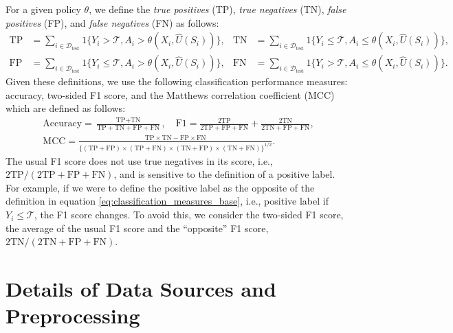 \documentclass[12pt]{article}
\begin{document}
For a given policy $\theta$, we define the \textit{true positives} (TP), \textit{true negatives} (TN), \textit{false positives} (FP), and \textit{false negatives} (FN) as follows:
\begin{equation}\label{eq:classification_measures_base}
\begin{aligned}
\text{TP} &= \sum_{i \in \mathcal{D}_{\text{test}}} 1 \{ Y_i > \mathcal{T}, A_i > \theta(X_i,\widehat{U}(S_i)) \} , & \text{TN} &= \sum_{i \in \mathcal{D}_{\text{test}}} 1 \{ Y_i \le \mathcal{T}, A_i \le \theta(X_i,\widehat{U}(S_i)) \} , \\
\text{FP} &= \sum_{i \in \mathcal{D}_{\text{test}}} 1 \{ Y_i \le \mathcal{T}, A_i > \theta(X_i,\widehat{U}(S_i)) \} , & \text{FN} &= \sum_{i \in \mathcal{D}_{\text{test}}} 1 \{ Y_i > \mathcal{T}, A_i \le \theta(X_i,\widehat{U}(S_i)) \} .
\end{aligned} 
\end{equation}
Given these definitions, we use the following classification performance measures: accuracy, two-sided F1 score, and the Matthews correlation coefficient (MCC) \citep{MCC}  which are defined as follows:
\begin{gather*}
\text{Accuracy} = \frac{\text{TP} + \text{TN}}{\text{TP} + \text{TN} + \text{FP} + \text{FN}} , \quad \text{F1} = \frac{2\text{TP}}{2\text{TP} + \text{FP} + \text{FN}} + \frac{2\text{TN}}{2\text{TN} + \text{FP} + \text{FN}} , \\
\text{MCC} = \frac{\text{TP} \times \text{TN} - \text{FP} \times \text{FN}}{\{(\text{TP} + \text{FP}) \times (\text{TP} + \text{FN}) \times (\text{TN} + \text{FP}) \times (\text{TN} + \text{FN})\}^{1/2}} .
\end{gather*}
The usual F1 score does not use true negatives in its score, i.e., $2\text{TP}/(2\text{TP}+\text{FP}+\text{FN})$, and is sensitive to the definition of a positive label. For example, if we were to define the positive label as the opposite of the definition in equation \eqref{eq:classification_measures_base}, i.e., positive label if $Y_i \le \mathcal{T}$, the F1 score changes. To avoid this, we consider the two-sided F1 score, the average of the usual F1 score and the ``opposite'' F1 score, $2\text{TN}/(2\text{TN}+\text{FP}+\text{FN})$.

\section{Details of Data Sources and Preprocessing}\label{sec:data source}
\end{document}
